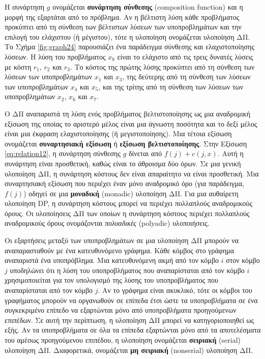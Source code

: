 \documentclass[12pt,a4paper]{article}
\begin{document}
\par\vspace{0.3cm}
\noindent
Η συνάρτηση $g$ ονομάζεται \textbf{συνάρτηση σύνθεσης} (\foreignlanguage{english}{composition function}) και η μορφή της 
εξαρτάται από το πρόβλημα. Αν η βέλτιστη λύση κάθε προβλήματος προκύπτει από τη σύνθεση των 
βέλτιστων λύσεων των υποπροβλημάτων και την επιλογή του ελάχιστου (ή μέγιστου), τότε η υλοποίηση 
ονομάζεται υλοποίηση ΔΠ. Το Σχήμα \ref{fig:graph24} παρουσιάζει ένα παράδειγμα σύνθεσης και ελαχιστοποίησης λύσεων. Η λύση του 
προβλήματος $x_8$ είναι το ελάχιστο από τις τρεις δυνατές λύσεις με κόστη $r_1$, $r_2$ και $r_3$. 
Το κόστος της πρώτης λύσης προκύπτει από τη σύνθεση των λύσεων των υποπροβλημάτων $x_1$ και $x_3$, 
της δεύτερης από τη σύνθεση των λύσεων των υποπροβλημάτων $x_4$ και $x_5$, και της τρίτης από τη 
σύνθεση των λύσεων των υποπροβλημάτων $x_2$, $x_6$ και $x_7$.

Ο ΔΠ αναπαριστά τη λύση ενός προβλήματος βελτιστοποίησης ως μια αναδρομική εξίσωση της οποίας το αριστερό μέλος είναι 
μια άγνωστη ποσότητα και το δεξί μέλος είναι μια έκφραση ελαχιστοποίησης (ή μεγιστοποίησης). Μια τέτοια εξίσωση ονομάζεται 
\textbf{συναρτησιακή εξίσωση} ή \textbf{εξίσωση βελτιστοποίησης}.
Στην Εξίσωση \ref{eq:relation12}, η συνάρτηση σύνθεσης $g$ δίνεται από $f(j) + c(j, x)$. Αυτή η συνάρτηση είναι 
προσθετική, καθώς είναι το άθροισμα δύο όρων. Σε μια γενική υλοποίηση ΔΠ, η συνάρτηση κόστους δεν 
είναι απαραίτητο να είναι προσθετική. Μια συναρτησιακή εξίσωση που περιέχει έναν μόνο αναδρομικό όρο 
(για παράδειγμα, $f(j)$) οδηγεί σε μια \textbf{μοναδική} (\foreignlanguage{english}{monadic}) υλοποίηση ΔΠ. Για μια αυθαίρετη υλοποίηση
DP, η συνάρτηση κόστους μπορεί να περιέχει πολλαπλούς αναδρομικούς όρους. Οι υλοποίησεις ΔΠ των οποίων η 
συνάρτηση κόστους περιέχει πολλαπλούς αναδρομικούς όρους ονομάζονται \textit{πολυαδικές} (\foreignlanguage{english}{polyadic}) υλοποιήσεις.

Οι εξαρτήσεις μεταξύ των υποπροβλημάτων σε μια υλοποίηση ΔΠ μπορούν να αναπαρασταθούν με ένα κατευθυνόμενο γράφημα. 
Κάθε κόμβος στο γράφημα αναπαριστά ένα υποπρόβλημα. Μια κατευθυνόμενη ακμή από τον κόμβο $i$ στον κόμβο $j$ υποδηλώνει 
ότι η λύση του υποπροβλήματος που αναπαρίσταται από τον κόμβο $i$ χρησιμοποιείται για τον υπολογισμό της λύσης του 
υποπροβλήματος που αναπαρίσταται από τον κόμβο $j$. Αν το γράφημα είναι ακυκλικό, τότε οι κόμβοι του γραφήματος μπορούν να 
οργανωθούν σε επίπεδα έτσι ώστε τα υποπροβλήματα σε ένα συγκεκριμένο επίπεδο 
να εξαρτώνται μόνο από υποπροβλήματα προηγούμενων επιπέδων. Σε
αυτή την περίπτωση, η υλοποίηση ΔΠ μπορεί να κατηγοριοποιηθεί ως
εξής. Αν τα υποπροβλήματα σε όλα τα επίπεδα εξαρτώνται μόνο από τα
αποτελέσματα του αμέσως προηγούμενου επιπέδου, η υλοποίηση ονομάζεται
\textbf{σειριακή} (\foreignlanguage{english}{serial}) υλοποίηση ΔΠ. Διαφορετικά, ονομάζεται
\textbf{μη σειριακή} (\foreignlanguage{english}{nonserial}) υλοποίηση ΔΠ.
\end{document}
